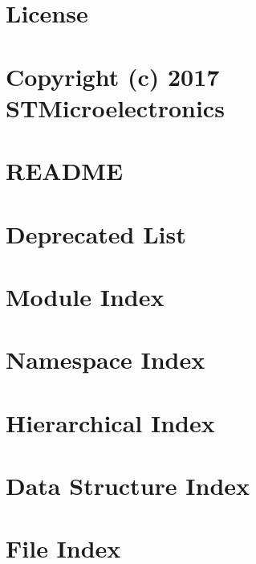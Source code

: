 \documentclass[twoside]{book}
\newcommand{\+}{\discretionary{\mbox{\scriptsize$\hookleftarrow$}}{}{}}
\begin{document}
\chapter{License}
\label{md_nucleo_l432kc_wifi__drivers__c_m_s_i_s__device__s_t__s_t_m32_l4xx__license}

\chapter{Copyright (c) 2017 STMicroelectronics}
\label{md_nucleo_l432kc_wifi__drivers__s_t_m32_l4xx__h_a_l__driver__license}

\chapter{README}
\label{md__r_e_a_d_m_e}

\chapter{Deprecated List}
\label{deprecated}

\chapter{Module Index}

\chapter{Namespace Index}

\chapter{Hierarchical Index}

\chapter{Data Structure Index}

\chapter{File Index}

\end{document}
